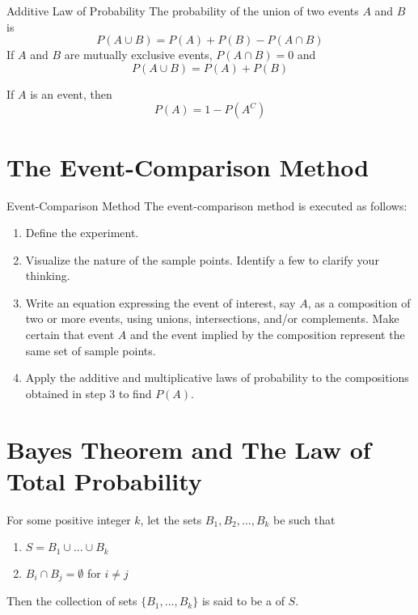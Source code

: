 \documentclass[12pt, a4paper, twoside, openright, titlepage]{book}
\begin{document}
\begin{thm}{Additive Law of Probability}{}
    The probability of the union of two events $A$ and $B$ is \begin{equation}
        P(A\cup B) = P(A) + P(B) - P(A\cap B)
    \end{equation}
    If $A$ and $B$ are mutually exclusive events, $P(A\cap B) = 0$ and \begin{equation}
        P(A\cup B) = P(A) + P(B)
    \end{equation}
\end{thm}


\begin{thm}{}{}
    If $A$ is an event, then \begin{equation}
        P(A) = 1 - P(A^C)
    \end{equation}
\end{thm}


\section{\textsection The Event-Comparison Method}

\begin{defn}{Event-Comparison Method}{}
    The event-comparison method is executed as follows: \begin{enumerate}
        \item Define the experiment.
        \item Visualize the nature of the sample points. Identify a few to clarify your thinking.
        \item Write an equation expressing the event of interest, say $A$, as a composition of two or more events, using unions, intersections, and/or complements. Make certain that event $A$ and the event implied by the composition represent the same set of sample points.
        \item Apply the additive and multiplicative laws of probability to the compositions obtained in step $3$ to find $P(A)$.
    \end{enumerate}
\end{defn}



\section{\textsection Bayes Theorem and The Law of Total Probability}

\begin{defn}{}{}
    For some positive integer $k$, let the sets $B_1,B_2,...,B_k$ be such that \begin{enumerate}
        \item $S = B_1 \cup ...\cup B_k$
        \item $B_i\cap B_j = \emptyset$ for $i \neq j$
    \end{enumerate}
    Then the collection of sets $\{B_1,...,B_k\}$ is said to be a  of $S$.
\end{defn}
\end{document}
